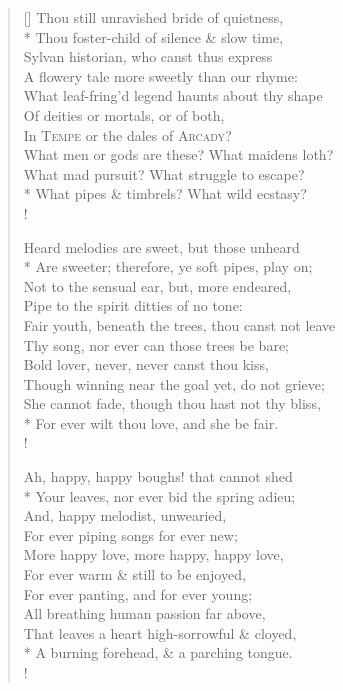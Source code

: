 \settowidth{\versewidth}{Thou still unravished bride of quietness,}
\begin{verse}[\versewidth]
Thou still unravished bride of quietness,\\*
\vin Thou foster-child of silence \& slow time,\\
Sylvan historian, who canst thus express\\
\vin A flowery tale more sweetly than our rhyme:\\
What leaf-fring'd legend haunts about thy shape\\
\vin Of deities or mortals, or of both,\\
\vin \vin In \textsc{Tempe} or the dales of \textsc{Arcady}?\\
\vin What men or gods are these? What maidens loth?\\
What mad pursuit? What struggle to escape?\\*
\vin \vin What pipes \& timbrels? What wild ecstasy?\\!

Heard melodies are sweet, but those unheard\\*
\vin Are sweeter; therefore, ye soft pipes, play on;\\
Not to the sensual ear, but, more endeared,\\
\vin Pipe to the spirit ditties of no tone:\\
Fair youth, beneath the trees, thou canst not leave\\
\vin Thy song, nor ever can those trees be bare;\\
\vin \vin Bold lover, never, never canst thou kiss,\\
Though winning near the goal yet, do not grieve;\\
\vin She cannot fade, though thou hast not thy bliss,\\*
\vin \vin For ever wilt thou love, and she be fair.\\!

Ah, happy, happy boughs! that cannot shed\\*
\vin Your leaves, nor ever bid the spring adieu;\\
And, happy melodist, unwearied,\\
\vin For ever piping songs for ever new;\\
More happy love, more happy, happy love,\\
\vin For ever warm \& still to be enjoyed,\\
\vin \vin For ever panting, and for ever young;\\
All breathing human passion far above,\\
\vin That leaves a heart high-sorrowful \& cloyed,\\*
\vin \vin A burning forehead, \& a parching tongue.\\!


\end{verse}
